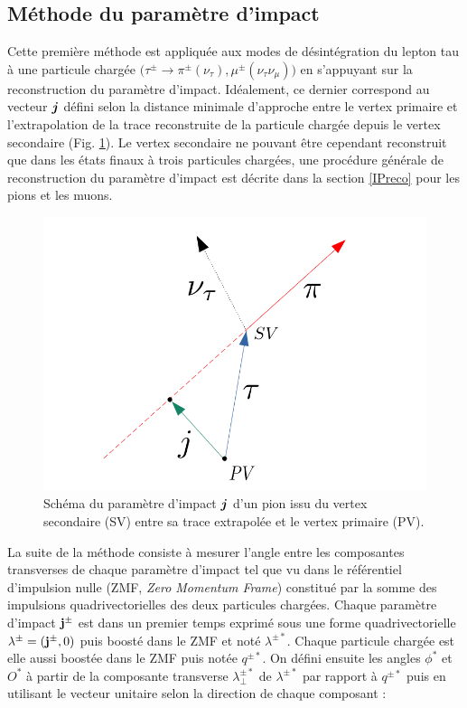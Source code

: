 \subsection{Méthode du paramètre d'impact}
\label{IPmethod}

Cette première méthode est appliquée aux modes de désintégration du lepton tau à une particule chargée $\bigl(\tau^{\pm}\rightarrow\pi^{\pm}(\nu_{\tau}),\mu^{\pm}(\nu_{\tau}\nu_{\mu})\bigr)$ en s'appuyant sur la reconstruction du paramètre d'impact. Idéalement, ce dernier correspond au vecteur $\vb*{j}$ défini selon la distance minimale d'approche entre le vertex primaire et l'extrapolation de la trace reconstruite de la particule chargée depuis le vertex secondaire (Fig. \ref{IP}). Le vertex secondaire ne pouvant être cependant reconstruit que dans les états finaux à trois particules chargées, une procédure générale de reconstruction du paramètre d'impact est décrite dans la section \ref{IPreco} pour les pions et les muons. \\

\begin{figure}[!ht]
\centering
    \includegraphics[scale=0.4]{Chapitre6/Images/IP.png} 
    \caption{Schéma du paramètre d'impact $\vb*{j}$ d'un pion issu du vertex secondaire (SV) entre sa trace extrapolée et le vertex primaire (PV).}
    \label{IP}
\end{figure}

La suite de la méthode consiste à mesurer l'angle entre les composantes transverses de chaque paramètre d'impact tel que vu dans le référentiel d'impulsion nulle (ZMF, \textit{Zero Momentum Frame}) constitué par la somme des impulsions quadrivectorielles des deux particules chargées. Chaque paramètre d'impact $\vb{j}^{\pm}$ est dans un premier temps exprimé sous une forme quadrivectorielle $\lambda^{\pm}=(\vb{j}^{\pm},0)$ puis boosté dans le ZMF et noté $\lambda^{\pm*}$. Chaque particule chargée est elle aussi boostée dans le ZMF puis notée $q^{\pm*}$. On défini ensuite les angles $\phi^*$ et $O^*$ à partir de la composante transverse $\lambda_{\perp}^{\pm*}$ de $\lambda^{\pm*}$ par rapport à $q^{\pm*}$ puis en utilisant le vecteur unitaire selon la direction de chaque composant :

